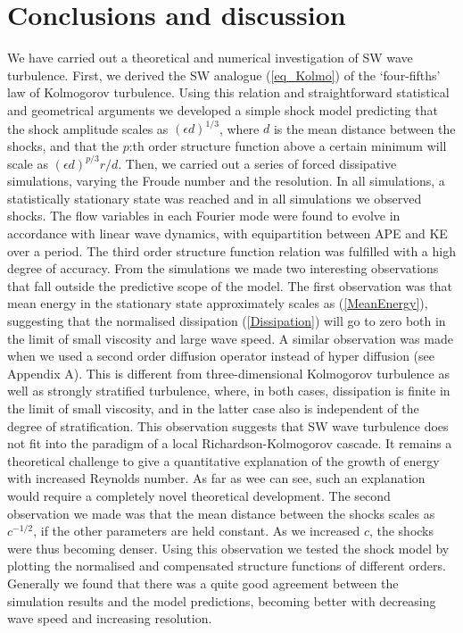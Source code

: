 \documentclass{jfm}
\begin{document}
\section{Conclusions and discussion}

We have carried out a theoretical and numerical investigation of SW wave
turbulence. First, we derived the SW analogue (\ref{eq_Kolmo}) of the
`four-fifths' law of Kolmogorov turbulence. Using this relation and
straightforward statistical and geometrical arguments we developed a simple
shock model predicting that the shock amplitude scales as $ (\epsilon d)^{1/3}
$, where $ d $ is the mean distance between the shocks, and that the $ p $:th
order structure function above a certain minimum will scale as $ (\epsilon
d)^{p/3} r/d $. Then, we carried out a series of  forced dissipative
simulations, varying the Froude number and the resolution. In all simulations,
a statistically stationary state was reached and in all simulations we
observed shocks. The flow variables in each Fourier mode were found to evolve
in accordance with linear wave dynamics, with equipartition between APE and KE
over a period. The third order structure function relation was fulfilled with a
high degree of accuracy. From the simulations we made two interesting
observations that fall outside the predictive scope of the model. The first
observation was that mean energy in the stationary state approximately scales
as (\ref{MeanEnergy}), suggesting that the normalised dissipation
(\ref{Dissipation}) will go to zero both in the limit of small viscosity and
large wave speed. A similar observation was made when we used a second order diffusion operator instead of hyper diffusion (see Appendix A).
This is different from three-dimensional Kolmogorov
turbulence as well as strongly stratified turbulence, where, in both cases,
dissipation is finite in the limit of small viscosity, and in the latter case
also is independent of the degree of stratification. This observation suggests
that SW wave turbulence does not fit into the paradigm of a local
Richardson-Kolmogorov cascade.  It remains a theoretical challenge to give a quantitative explanation of the growth of energy with increased Reynolds number. 
As far as wee can see, such an explanation would require a completely novel theoretical development.
The second observation we made was that the mean
distance between the shocks scales as $ c^{-1/2} $, if the other parameters are
held constant. As we increased $ c $, the shocks were thus becoming denser.
Using this observation we tested the shock model by plotting the normalised and
compensated structure functions of different orders. Generally we found that
there was a quite good agreement between the simulation results and the model
predictions, becoming better with decreasing wave speed and increasing
resolution.
\end{document}
